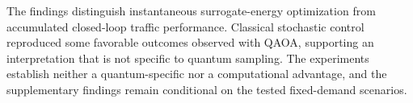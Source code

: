 The findings distinguish instantaneous surrogate-energy optimization from accumulated closed-loop traffic performance. Classical stochastic control reproduced some favorable outcomes observed with QAOA, supporting an interpretation that is not specific to quantum sampling. The experiments establish neither a quantum-specific nor a computational advantage, and the supplementary findings remain conditional on the tested fixed-demand scenarios.
